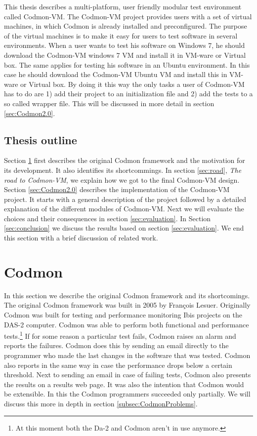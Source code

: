 \documentclass{article}
\newcommand{\project}{Codmon-VM}
\begin{document}
\noindent This thesis describes a multi-platform, user friendly modular test environment called \project{}. The \project{} project provides users with a set of virtual machines,
in which Codmon is already installed and preconfigured. The purpose of the virtual machines is to make it easy for users to test software in several environments.  When a user wants to 
test his software on Windows 7, he should download the \project{} windows 7 VM and install it in VM-ware or Virtual box. The same applies for testing his software in an Ubuntu environment. In this case he should 
download the \project{} Ubuntu VM and install this in VM-ware or Virtual box. By doing it this way the  only tasks a user of \project{} has to do are 1) add their project to an initialization file and 2) add 
the tests to a so called wrapper file. This will be discussed in more detail in section \ref{sec:Codmon2.0}.


\subsection{Thesis outline}
\label{subsec:Thesisoutline}
Section \ref{sec:codmon} first describes the original Codmon framework and the motivation for its development. It also identifies its shortcommings. In section \ref{sec:road}, \emph{The road to \project{}}, 
we explain how we got to the final \project{} design. Section \ref{sec:Codmon2.0} describes the implementation of the \project{} project. 
It starts with a general description of the project followed by a detailed explanation of the different modules of \project{}. Next we will evaluate the choices and their consequences 
in section \ref{sec:evaluation}. In Section \ref{sec:conclusion} we discuss the results based on section \ref{sec:evaluation}. We end this section with a brief discussion of related work.

\newpage
\section{Codmon}
\label{sec:codmon}
In this section we describe the original Codmon framework and its shortcomings. The original Codmon framework was built in 2005 by François Lesuer\cite{Codmon}. Originally Codmon was built for 
testing and performance monitoring Ibis projects\cite{Ibis} \cite{Satin}\cite{MPJ}\cite{IPL}\cite{GMI} on the DAS-2\cite{das2} computer. Codmon was able to perform both functional and performance tests.\footnote{At 
this moment both the Da-2 and Codmon aren't in use anymore.} If for some reason a particular test fails, Codmon raises an alarm and reports the failures. Codmon does this by 
sending an email directly to the programmer who made the last changes in the software that was tested. Codmon also reports in the same way in case the performance drops below a certain threshold. 
Next to sending an email in case of failing tests, Codmon also presents the results on a results web page. It was also the intention that Codmon would be extensible. In this the Codmon programmers 
succeeded only partially. We will discuss this more in depth in section \ref{subsec:CodmonProblems}.  
\end{document}
